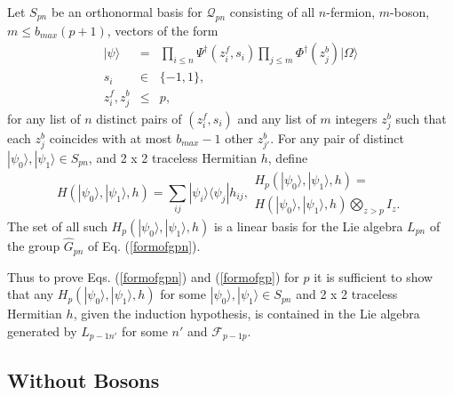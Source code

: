 \documentclass[twocolumn,amsmath,amssymb]{revtex4-1}
\begin{document}
Let $S_{p n}$ be an orthonormal basis for $\mathcal{Q}_{p n}$ consisting of
all $n$-fermion, $m$-boson, $m \le b_{max}( p + 1)$, vectors of the form
\begin{subequations}
\begin{eqnarray}
\label{psi0}
| \psi  \rangle  & = & \prod_{i \le n} \Psi^{\dagger}( z^f_i, s_i) \prod_{ j \le m}\Phi^{\dagger}(z^b_j) |\Omega \rangle  \\
\label{psi1}
s_i  & \in & \{ -1, 1 \}, \\
\label{psi2}
z^f_i, z^b_j & \le & p,
\end{eqnarray}
\end{subequations}
for any list of $n$ distinct pairs of $(z^f_i, s_i)$ and
any list of $m$ integers $z^b_j$ such that
each $z^b_j$ coincides with at most $b_{max} -1$ other $z^b_{j'}$.
For any pair of distinct $|\psi_0 \rangle , |\psi_1 \rangle  \in S_{p n}$, and
2 x 2 traceless Hermitian $h$, define
\begin{subequations}
\begin{equation}
\label{defcaph}
H( |\psi_0 \rangle , |\psi_1 \rangle , h) = \sum_{ij} |\psi_i \rangle \langle \psi_j| h_{ij},
\end{equation}
\begin{multline}
\label{defcaph1}
H_p( |\psi_0 \rangle , |\psi_1 \rangle , h) = \\ H( |\psi_0 \rangle , |\psi_1 \rangle , h) \bigotimes_{z>p} I_z.
\end{multline}
\end{subequations}
The set of all such $H_p( |\psi_0 \rangle , |\psi_1 \rangle , h)$ is a linear basis
for the Lie algebra $L_{p n}$ of the group $\hat{G}_{p n}$ of Eq. (\ref{formofgpn}). 


Thus to prove Eqs. (\ref{formofgpn}) and (\ref{formofgp}) for $p$ it is 
sufficient to show that any $H_p( |\psi_0 \rangle , |\psi_1 \rangle , h)$ for some $|\psi_0 \rangle , |\psi_1 \rangle  \in S_{p n}$ and
2 x 2 traceless Hermitian $h$, given the induction hypothesis, is contained in the Lie algebra generated
by $L_{p-1 n'}$ for some $n'$ and $\mathcal{F}_{p-1 p}$.

\subsection{\label{app:withoutbosons} Without Bosons}
\end{document}
